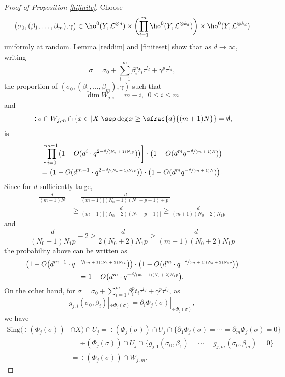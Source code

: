 \begin{proof}[Proof of Proposition \ref{hifinite}]
Choose
\[
\bigl(\sigma_0, (\beta_1,\dots, \beta_m), \gamma\bigr)\in \ho^0(Y,\mathcal{L}^{\otimes d})\times \biggl(\prod_{i=1}^m \ho^0(Y,\mathcal{L}^{\otimes k_d}) \biggr) \times \ho^0(Y, \mathcal{L}^{\otimes k_d})
\]
uniformly at random. Lemma \ref{reddim} and \ref{finiteset} show that as $d\to \infty$, writing
\[
\sigma=\sigma_0+\sum_{i=1}^{m} \beta_i^pt_i\tau^{l_d}+\gamma^p\tau^{l_d},
\]
the proportion of $(\sigma_0, (\beta_1,\dots, \beta_m), \gamma)$ such that
\[
\dim W_{j,i}=m-i,\ \ 0\leq i\leq m
\]
and
\[
\div \sigma\cap W_{j,m}\cap \left\{ x\in |X|\sep \deg x\geq\sfrac{d}{(m+1)N} \right\}=\emptyset,
\]
is
\begin{multline*}
\biggl[ \prod_{i=0}^{m-1}\bigl(1-O(d^i\cdot q^{2-\sfrac{d}{(N_0+1)N_1p}})\bigr) \biggr]\cdot \bigl(1-O(d^m q^{-\sfrac{d}{(m+1)N}}) \bigr) \\
=\bigl(1-O(d^{m-1}\cdot q^{2-\sfrac{d}{(N_0+1)N_1p}})\bigr)\cdot \bigl(1-O(d^m q^{-\sfrac{d}{(m+1)N}}) \bigr).
\end{multline*}
Since for $d$ sufficiently large,
\begin{align*}
\frac{d}{(m+1)N}&= \frac{d}{(m+1)\big[(N_0+1)(N_1+p-1)+p\big]}\\
&\geq \frac{d}{(m+1)\big[(N_0+2)(N_1+p-1)\big]}\geq \frac{d}{(m+1)(N_0+2)N_1 p}
\end{align*}
and
\[
\frac{d}{(N_0+1)N_1p}-2\geq \frac{d}{2(N_0+2)N_1 p}\geq \frac{d}{(m+1)(N_0+2)N_1 p}
\]
the probability above can be written as
\begin{multline*}
\bigl(1-O\bigl(d^{m-1}\cdot q^{-\sfrac{d}{(m+1)(N_0+2)N_1 p}}\bigr)\bigr)\cdot \bigl(1-O\bigl(d^{m}\cdot q^{-\sfrac{d}{(m+1)(N_0+2)N_1 p}}\bigr)\bigr)\\
=1-O\bigl(d^{m}\cdot q^{-\sfrac{d}{(m+1)(N_0+2)N_1 p}}\bigr).
\end{multline*}
On the other hand, for $\sigma=\sigma_0+\sum_{i=1}^{m} \beta_i^pt_i\tau^{l_d}+\gamma^p\tau^{l_d}$, as
\[
g_{j,i}(\sigma_0,\beta_i)|_{ \div \Phi_{j}(\sigma)}=\partial_i\Phi_{j}(\sigma)|_{ \div \Phi_{j}(\sigma)},
\]
we have
\begin{align*}
\mathrm{Sing}(\div (\Phi_j(\sigma))&\cap X)\cap U_j
= \div (\Phi_j(\sigma))\cap U_j\cap \{ \partial_1\Phi_j(\sigma)=\cdots=\partial_m\Phi_j(\sigma)=0 \}\\
&=\div (\Phi_j(\sigma))\cap U_j\cap \{ g_{j,1}(\sigma_0,\beta_1)=\cdots=g_{j,m}(\sigma_0,\beta_m)=0\} \\
&= \div (\Phi_j(\sigma))\cap W_{j,m}.

\end{align*}
\end{proof}
